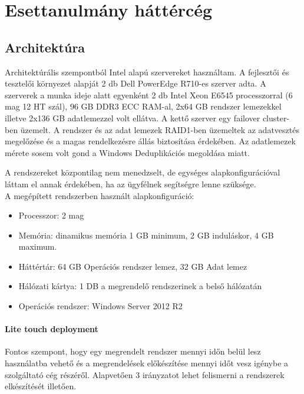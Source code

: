 \documentclass[12pt,oneside,justify,table]{book}
\begin{document}


\chapter{Esettanulmány háttércég}

\section{Architektúra}

Architektúrális szempontból Intel alapú szervereket használtam. A fejlesztői és tesztelői környezet alapját 2 db Dell PowerEdge R710-es szerver adta. A szerverek a munka ideje alatt egyenként 2 db Intel Xeon E6545 processzorral (6 mag 12 HT szál), 96 GB DDR3 ECC RAM-al, 2x64 GB rendszer lemezekkel illetve 2x136 GB adatlemezzel volt ellátva. A kettő szerver egy failover cluster-ben üzemelt. A rendszer és az adat lemezek RAID1-ben üzemeltek az adatvesztés megelőzése és a magas rendelkezésre állás biztosítása érdekében. Az adatlemezek mérete sosem volt gond a Windows Deduplikációs megoldása miatt.

A rendszereket központilag nem menedzselt, de egységes alapkonfigurációval láttam el annak érdekében, ha az ügyfélnek segítségre lenne szüksége. \\

\noindent A megépített rendszerben használt alapkonfiguráció:
\begin{itemize}
	\item Processzor: 2 mag
	\item Memória: dinamikus memória 1 GB minimum, 2 GB induláskor, 4 GB maximum.
	\item Háttértár: 64 GB Operációs rendszer lemez, 32 GB Adat lemez
	\item Hálózati kártya: 1 DB a megrendelő rendszerinek a belső hálózatán
	\item Operációs rendszer: Windows Server 2012 R2
\end{itemize}

\subsubsection{Lite touch deployment}
Fontos szempont, hogy egy megrendelt rendszer mennyi időn belül lesz használatba vehető és a megrendelések előkészítése mennyi időt vesz igénybe a szolgáltató cég részéről. Alapvetően 3 irányzatot lehet felismerni a rendszerek elkészítését illetően.\\
\end{document}
